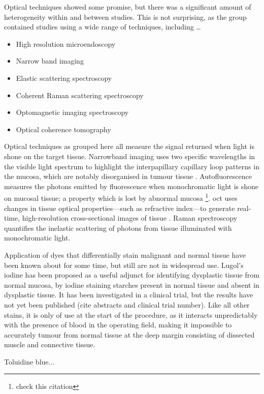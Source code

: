 Optical techniques showed some promise, but there was a significant amount of heterogeneity within and between studies. 
This is not surprising, as the group contained studies using a wide range of techniques, including \ldots
\begin{itemize}
\item High resolution microendoscopy
\item Narrow band imaging
\item Elastic scattering spectroscopy
\item Coherent Raman scattering spectroscopy
\item Optomagnetic imaging spectroscopy
\item Optical coherence tomography
\end{itemize}
Optical techniques as grouped here all measure the signal returned when light is shone on the target tissue.
Narrowband imaging uses two specific wavelengths in the visible light spectrum to highlight the interpapillary capillary loop patterns in the mucosa, which are notably disorganised in tumour tissue \cite{vuEfficacyNarrowBand2014}.
Autofluorescence measures the photons emitted by fluorescence when monochromatic light is shone on mucosal tissue; a property which is lost by abnormal mucosa \cite{leey.-j.IntraoperativeFluorescenceGuidedSurgery2020}\footnote{check this citation}.
\Gls{oct} uses changes in tissue optical properties---such as refractive index---to generate real-time, high-resolution cross-sectional images of tissue \cite{heidaria.e.UseOpticalCoherence2020}.
Raman spectroscopy quantifies the inelastic scattering of photons from tissue illuminated     with monochromatic light.


Application of dyes that differentially stain malignant and normal tissue have been known about for some time, but still are not in widespread use.
Lugol's iodine has been proposed as a useful adjunct for identifying dysplastic tissue from normal mucosa, by iodine staining starches present in normal tissue and absent in dysplastic tissue.
It has been investigated in a clinical trial, but the results have not yet been published (cite abstracts and clinical trial number).
Like all other stains, it is only of use at the start of the procedure, as it interacts unpredictably with the presence of blood in the operating field, making it impossible to accurately tumour from normal tissue at the deep margin consisting of dissected muscle and connective tissue.

Toluidine blue...

